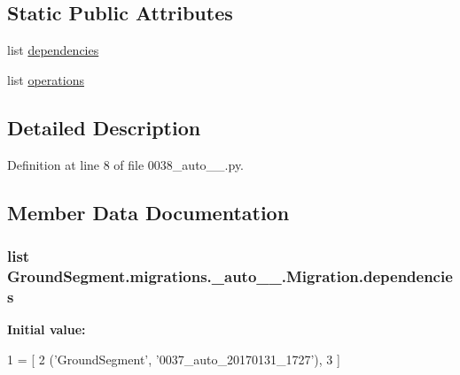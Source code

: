 \subsection*{Static Public Attributes}
\begin{DoxyCompactItemize}
\item 
list \hyperlink{class_ground_segment_1_1migrations_1_10038__auto__20170131__1731_1_1_migration_a23994c160a84f055a544253fb0911553}{dependencies}
\item 
list \hyperlink{class_ground_segment_1_1migrations_1_10038__auto__20170131__1731_1_1_migration_ac962eca1e5bcdc65db10f1d523cbcace}{operations}
\end{DoxyCompactItemize}


\subsection{Detailed Description}


Definition at line 8 of file 0038\+\_\+auto\+\_\+\_.\+py.



\subsection{Member Data Documentation}
\hypertarget{class_ground_segment_1_1migrations_1_10038__auto__20170131__1731_1_1_migration_a23994c160a84f055a544253fb0911553}{}
\subsubsection[{dependencies}]{\setlength{\rightskip}{0pt plus 5cm}list Ground\+Segment.\+migrations.\+\_\+auto\+\_\+\_.\+Migration.\+dependencies\hspace{0.3cm}{\ttfamily [static]}}\label{class_ground_segment_1_1migrations_1_10038__auto__20170131__1731_1_1_migration_a23994c160a84f055a544253fb0911553}
{\bfseries Initial value\+:}
\begin{DoxyCode}
1 = [
2         (\textcolor{stringliteral}{'GroundSegment'}, \textcolor{stringliteral}{'0037\_auto\_20170131\_1727'}),
3     ]
\end{DoxyCode}


